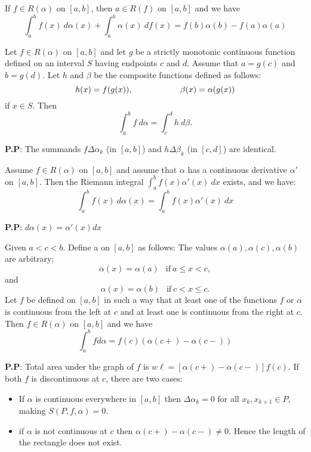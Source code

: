 \documentclass[10pt,a4paper]{book}
\begin{document}
\begin{Thm}
If $f \in R(\alpha)$ on $[a, b]$, then $a \in R(f)$ on $[a, b]$ and we have
    $$\int_{a}^{b} f(x) \ d\alpha(x) + \int_{a}^{b} \alpha(x)\ df(x) = f(b)\alpha(b) - f(a)\alpha(a)$$
\end{Thm}

\begin{Thm}
Let $f \in R(\alpha)$ on $[a, b]$ and let $g$ be a strictly monotonic continuous function defined on an interval $S$ having endpoints $c$ and $d$. Assume that $a = g(c)$ and $b = g(d)$. Let $h$ and $\beta$ be the composite functions defined as follows:
      $$h(x) = f(g(x)), \hspace*{2cm} \beta(x) = \alpha(g(x))$$
if $x \in S$. Then
$$\int_a^b f\  d\alpha = \int_c^d h\  d\beta.$$

\end{Thm}
\newcommand{\PP}{\noindent \textbf{P.P}: }
\newcommand{\da}{d \alpha}

\PP The summands $f \Delta \alpha_k$ (in $[a,b]$) and $h \Delta \beta_k$ (in $[c,d]$) are identical.


\begin{Thm}
Assume $f \in R(\alpha)$ on $[a, b]$ and assume that $\alpha$ has a continuous derivative $\alpha'$ on $[a, b]$. Then the Riemann integral $\int_a^b f(x) \alpha'(x)\ dx$ exists, and we have:
$$\int_a^b f(x)\  d\alpha(x) = \int_a^b f(x) \alpha'(x)\ dx$$
\end{Thm}
\PP $\da(x) = \alpha'(x) dx$

\begin{Thm}
Given $a < c < b$. Define a on $[a, b]$ as follows: The values $\alpha(a),
\alpha(c), \alpha(b)$ are arbitrary;
$$\alpha(x) = \alpha(a)\ \ \text{    if}\ a \leq x < c,$$
and
$$\alpha(x) = \alpha(b)\ \ \text{    if}\  c < x \leq c.$$
Let $f$ be defined on $[a, b]$ in such a way that at least one of the functions $f$ or $\alpha$ is
continuous from the left at $c$ and at least one is continuous from the right at $c$. Then
$f \in R(\alpha)$ on $[a, b]$ and we have
$$\int_a^b f \da = f(c)(\alpha(c+) - \alpha(c-))$$

\end{Thm}
\PP Total area under the graph of $f$ is $w\ell = [\alpha(c+) - \alpha(c-)]f(c)$. If both $f$ is discontinuous at $c$, there are two cases:
\begin{itemize}
    \item If $\alpha$ is continuous everywhere in $[a,b]$ then $ \Delta \alpha_k = 0$ for all $x_k, x_{k+1} \in P$, making $S(P,f,\alpha)=0$.
    \item if $\alpha$ is not continuous at $c$ then $\alpha(c+) - \alpha(c-) \neq 0$. Hence the length of the rectangle does not exist. 
\end{itemize}
\end{document}
